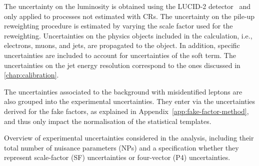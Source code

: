 The uncertainty on the luminosity is obtained using the LUCID-2 detector~\cite{ATLAS-CONF-2019-021} and only applied to processes not estimated with CRs. 
The uncertainty on the pile-up reweighting procedure is estimated by varying the scale factor used for the reweighting. 
Uncertainties on the physics objects included in the \MET calculation, i.e., electrons, muons, and jets, are propagated to the \MET object. In addition, specific \MET uncertainties are included to account for uncertainties of the \MET soft term.
The uncertainties on the jet energy resolution correspond to the ones discussed in \cref{chap:calibration}. 

The uncertainties associated to the background with misidentified leptons are also grouped into the experimental uncertainties. They enter via the uncertainties derived for the fake factors, as explained in Appendix~\ref{app:fake-factor-method}, and thus only impact the normalisation of the statistical templates. 
\begin{table}[ht]
    \begin{center}
        
    \end{center}
    \caption[Overview of experimental uncertainties.]{Overview of experimental uncertainties considered in the \HWW analysis, including their total number of nuisance parameters (NPs) and a specification whether they represent scale-factor (SF) uncertainties or four-vector (P4) uncertainties.
    }
    \label{tab:exp-uncertainties}
\end{table}



